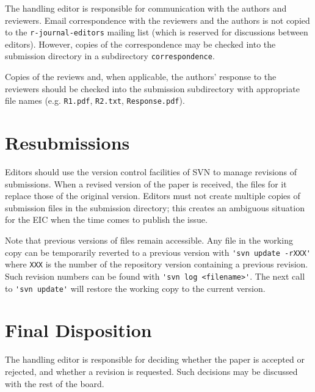 \documentclass[11pt]{article}
\begin{document}
The handling editor is responsible for communication with the authors
and reviewers. Email correspondence with the reviewers and the authors
is not copied to the \verb+r-journal-editors+ mailing list (which is
reserved for discussions between editors). However, copies of the
correspondence may be checked into the submission directory in a
subdirectory \texttt{correspondence}.

Copies of the reviews and, when applicable, the authors' response to
the reviewers should be checked into the submission subdirectory with
appropriate file names (e.g. \texttt{R1.pdf}, \texttt{R2.txt},
\texttt{Response.pdf}).

\section{Resubmissions}

Editors should use the version control facilities of SVN to manage
revisions of submissions. When a revised version of the paper is
received, the files for it replace those of the original
version. Editors must not create multiple copies of submission files
in the submission directory; this creates an ambiguous situation for
the EIC when the time comes to publish the issue.

Note that previous versions of files remain accessible.  Any file in
the working copy can be temporarily reverted to a previous version
with \verb+'svn update -rXXX'+ where \verb+XXX+ is the number of the
repository version containing a previous revision.  Such revision
numbers can be found with \verb+'svn log <filename>'+. The next call
to \verb+'svn update'+ will restore the working copy to the current
version.

\section{Final Disposition}

The handling editor is responsible for deciding whether the paper is
accepted or rejected, and whether a revision is requested. Such
decisions may be discussed with the rest of the board.
\end{document}
